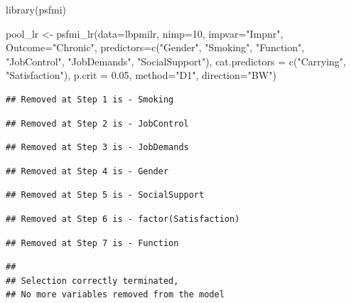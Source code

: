 \documentclass[
]{book}
\newenvironment{Shaded}{\begin{snugshade}}{\end{snugshade}}
\newcommand{\AttributeTok}[1]{\textcolor[rgb]{0.77,0.63,0.00}{#1}}
\newcommand{\DecValTok}[1]{\textcolor[rgb]{0.00,0.00,0.81}{#1}}
\newcommand{\FloatTok}[1]{\textcolor[rgb]{0.00,0.00,0.81}{#1}}
\newcommand{\FunctionTok}[1]{\textcolor[rgb]{0.00,0.00,0.00}{#1}}
\newcommand{\NormalTok}[1]{#1}
\newcommand{\OtherTok}[1]{\textcolor[rgb]{0.56,0.35,0.01}{#1}}
\newcommand{\StringTok}[1]{\textcolor[rgb]{0.31,0.60,0.02}{#1}}
\begin{document}
\begin{Shaded}
\begin{Highlighting}[]
\FunctionTok{library}\NormalTok{(psfmi)}

\NormalTok{pool\_lr }\OtherTok{\textless{}{-}} \FunctionTok{psfmi\_lr}\NormalTok{(}\AttributeTok{data=}\NormalTok{lbpmilr, }\AttributeTok{nimp=}\DecValTok{10}\NormalTok{, }\AttributeTok{impvar=}\StringTok{"Impnr"}\NormalTok{, }\AttributeTok{Outcome=}\StringTok{"Chronic"}\NormalTok{,}
  \AttributeTok{predictors=}\FunctionTok{c}\NormalTok{(}\StringTok{"Gender"}\NormalTok{, }\StringTok{"Smoking"}\NormalTok{, }\StringTok{"Function"}\NormalTok{, }\StringTok{"JobControl"}\NormalTok{, }\StringTok{"JobDemands"}\NormalTok{,}
  \StringTok{"SocialSupport"}\NormalTok{), }\AttributeTok{cat.predictors =} \FunctionTok{c}\NormalTok{(}\StringTok{"Carrying"}\NormalTok{, }\StringTok{"Satisfaction"}\NormalTok{), }
  \AttributeTok{p.crit =} \FloatTok{0.05}\NormalTok{, }\AttributeTok{method=}\StringTok{"D1"}\NormalTok{, }\AttributeTok{direction=}\StringTok{"BW"}\NormalTok{)}
\end{Highlighting}
\end{Shaded}

\begin{verbatim}
## Removed at Step 1 is - Smoking
\end{verbatim}

\begin{verbatim}
## Removed at Step 2 is - JobControl
\end{verbatim}

\begin{verbatim}
## Removed at Step 3 is - JobDemands
\end{verbatim}

\begin{verbatim}
## Removed at Step 4 is - Gender
\end{verbatim}

\begin{verbatim}
## Removed at Step 5 is - SocialSupport
\end{verbatim}

\begin{verbatim}
## Removed at Step 6 is - factor(Satisfaction)
\end{verbatim}

\begin{verbatim}
## Removed at Step 7 is - Function
\end{verbatim}

\begin{verbatim}
## 
## Selection correctly terminated, 
## No more variables removed from the model
\end{verbatim}
\end{document}
